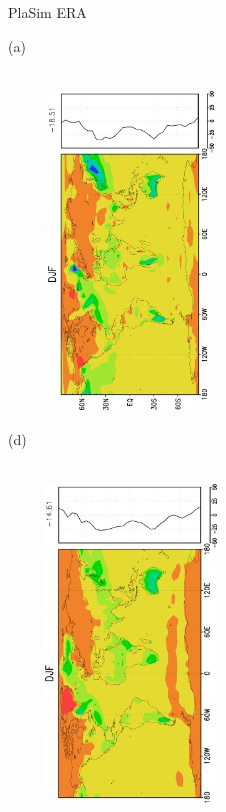\documentclass[12pt,a4paper,twoside,openright,headinclude,liststotoc,bibtotoc]{scrreprt}
\begin{document}
\begin{figure}[H]
\hspace{2.9cm}PlaSim \vspace{0.2cm}\hspace{7.2cm} ERA \\
\parbox{8.5cm}{\hspace{0.50cm}\begin{scriptsize}(a)\end{scriptsize} \vspace{-0.7cm} \\
\includegraphics[height=8.5cm,width=6.5cm,angle=-90]
{eps/zonalysmsshflu146DJF.eps}
}
\parbox{8.5cm}{\hspace{0.30cm}\begin{scriptsize}(d)\end{scriptsize} \vspace{-0.7cm} \\
\includegraphics[height=8.5cm,width=6.5cm,angle=-90]
{eps/zonalt21ysmsshfl146DJFfinal.eps}
}
\end{figure}
\end{document}
